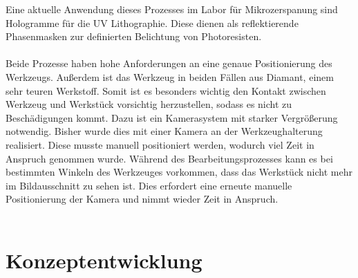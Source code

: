 \documentclass[12pt,a4paper,bibliography=totocnumbered,listof=totocnumbered]{scrartcl}
\begin{document}
\break
Eine aktuelle Anwendung dieses Prozesses im Labor für Mikrozerspanung sind Hologramme für die UV Lithographie. Diese dienen als reflektierende Phasenmasken zur definierten Belichtung von Photoresisten. \\ \\
\pagebreak
Beide Prozesse haben hohe Anforderungen an eine genaue Positionierung des Werkzeugs. Außerdem ist das Werkzeug in beiden Fällen aus Diamant, einem sehr teuren Werkstoff. Somit ist es besonders wichtig den Kontakt zwischen Werkzeug und Werkstück vorsichtig herzustellen, sodass es nicht zu Beschädigungen kommt. Dazu ist ein Kamerasystem mit starker Vergrößerung notwendig. Bisher wurde dies mit einer Kamera an der Werkzeughalterung realisiert. Diese musste manuell positioniert werden, wodurch viel Zeit in Anspruch genommen wurde. Während des Bearbeitungsprozesses kann es bei bestimmten Winkeln des Werkzeuges vorkommen, dass das Werkstück nicht mehr im Bildausschnitt zu sehen ist. Dies erfordert eine erneute manuelle Positionierung der Kamera und nimmt wieder Zeit in Anspruch. \\ \\

\section{Konzeptentwicklung}
\end{document}
